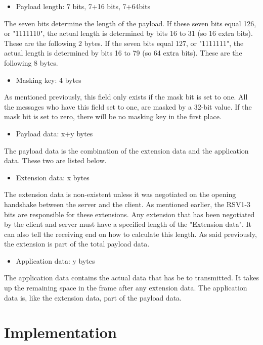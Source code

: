 \documentclass[a4paper, 11pt]{report}
\begin{document}
	\begin{itemize}
		\item {Payload length: 7 bits, 7+16 bits, 7+64bits}
	\end{itemize}
The seven bits determine the length of the payload. If these seven bits equal 126, or "1111110", the actual length is determined by bits 16 to 31 (so 16 extra bits). These are the following 2 bytes. If the seven bits equal 127, or "1111111", the actual length is determined by bits 16 to 79 (so 64 extra bits). These are the following 8 bytes.

	\begin{itemize}
		\item {Masking key: 4 bytes}
	\end{itemize}
As mentioned previously, this field only exists if the mask bit is set to one. All the messages who have this field set to one, are masked by a 32-bit value. If the mask bit is set to zero, there will be no masking key in the first place.

	\begin{itemize}
		\item{Payload data: x+y bytes}
	\end{itemize}
The payload data is the combination of the extension data and the application data. These two are listed below.

	\begin{itemize}
		\item{Extension data: x bytes}
	\end{itemize}
The extension data is non-existent unless it was negotiated on the opening handshake between the server and the client. As mentioned earlier, the RSV1-3 bits are responsible for these extensions. Any extension that has been negotiated by the client and server must have a specified length of the "Extension data". It can also tell the receiving end on how to calculate this length. As said previously, the extension is part of the total payload data.
	
	\begin{itemize}
		\item{Application data: y bytes}
	\end{itemize}
The application data contains the actual data that has be to transmitted. It takes up the remaining space in the frame after any extension data. The application data is, like the extension data, part of the payload data.

	
	\chapter{Implementation}
	
\end{document}
